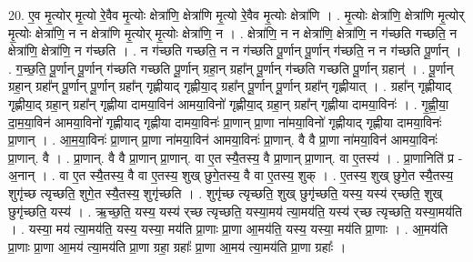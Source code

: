 \documentclass[17pt]{extarticle}
\begin{document}
20. ए॒व मृ॒त्योर् मृ॒त्यो रे॒वैव मृ॒त्योः क्षेत्रा॑णि॒ क्षेत्रा॑णि मृ॒त्यो रे॒वैव मृ॒त्योः क्षेत्रा॑णि । . मृ॒त्योः क्षेत्रा॑णि॒ क्षेत्रा॑णि मृ॒त्योर् मृ॒त्योः क्षेत्रा॑णि॒ न न क्षेत्रा॑णि मृ॒त्योर् मृ॒त्योः क्षेत्रा॑णि॒ न । . क्षेत्रा॑णि॒ न न क्षेत्रा॑णि॒ क्षेत्रा॑णि॒ न ग॑च्छति गच्छति॒ न क्षेत्रा॑णि॒ क्षेत्रा॑णि॒ न ग॑च्छति । . न ग॑च्छति गच्छति॒ न न ग॑च्छति पू॒र्णान् पू॒र्णान् ग॑च्छति॒ न न ग॑च्छति पू॒र्णान् । . ग॒च्छ॒ति॒ पू॒र्णान् पू॒र्णान् ग॑च्छति गच्छति पू॒र्णान् ग्रहा॒न् ग्रहा᳚न् पू॒र्णान् ग॑च्छति गच्छति पू॒र्णान् ग्रहान्॑ । . पू॒र्णान् ग्रहा॒न् ग्रहा᳚न् पू॒र्णान् पू॒र्णान् ग्रहा᳚न् गृह्णीयाद् गृह्णीया॒द् ग्रहा᳚न् पू॒र्णान् पू॒र्णान् ग्रहा᳚न् गृह्णीयात् । . ग्रहा᳚न् गृह्णीयाद् गृह्णीया॒द् ग्रहा॒न् ग्रहा᳚न् गृह्णीया दामया॒विन॑ आमया॒विनो॑ गृह्णीया॒द् ग्रहा॒न् ग्रहा᳚न् गृह्णीया दामया॒विनः॑ । . गृ॒ह्णी॒या॒ दा॒म॒या॒विन॑ आमया॒विनो॑ गृह्णीयाद् गृह्णीया दामया॒विनः॑ प्रा॒णान् प्रा॒णा ना॑मया॒विनो॑ गृह्णीयाद् गृह्णीया दामया॒विनः॑ प्रा॒णान् । . आ॒म॒या॒विनः॑ प्रा॒णान् प्रा॒णा ना॑मया॒विन॑ आमया॒विनः॑ प्रा॒णान्. वै वै प्रा॒णा ना॑मया॒विन॑ आमया॒विनः॑ प्रा॒णान्. वै । . प्रा॒णान्. वै वै प्रा॒णान् प्रा॒णान्. वा ए॒त स्यै॒तस्य॒ वै प्रा॒णान् प्रा॒णान्. वा ए॒तस्य॑ । . प्रा॒णानिति॑ प्र - अ॒नान् । . वा ए॒त स्यै॒तस्य॒ वै वा ए॒तस्य॒ शुख् छुगे॒तस्य॒ वै वा ए॒तस्य॒ शुक् । . ए॒तस्य॒ शुख् छुगे॒त स्यै॒तस्य॒ शुगृ॑च्छ त्यृच्छति॒ शुगे॒त स्यै॒तस्य॒ शुगृ॑च्छति । . शुगृ॑च्छ त्यृच्छति॒ शुख् छुगृ॑च्छति॒ यस्य॒ यस्य॑ र्‌च्छति॒ शुख् छुगृ॑च्छति॒ यस्य॑ । . ऋ॒च्छ॒ति॒ यस्य॒ यस्य॑ र्‌च्छ त्यृच्छति॒ यस्या॒मय॑ त्या॒मय॑ति॒ यस्य॑ र्‌च्छ त्यृच्छति॒ यस्या॒मय॑ति । . यस्या॒ मय॑ त्या॒मय॑ति॒ यस्य॒ यस्या॒ मय॑ति प्रा॒णाः प्रा॒णा आ॒मय॑ति॒ यस्य॒ यस्या॒ मय॑ति प्रा॒णाः । . आ॒मय॑ति प्रा॒णाः प्रा॒णा आ॒मय॑ त्या॒मय॑ति प्रा॒णा ग्रहा॒ ग्रहाः᳚ प्रा॒णा आ॒मय॑ त्या॒मय॑ति प्रा॒णा ग्रहाः᳚ । \newline
\end{document}
